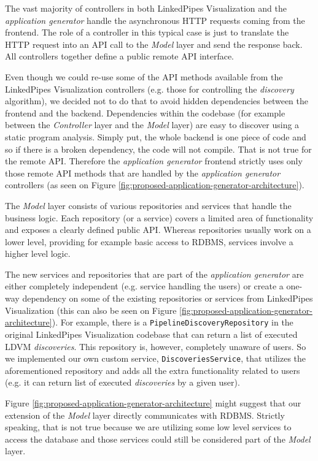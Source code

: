 The vast majority of controllers in both LinkedPipes Visualization and the \emph{application generator} handle the asynchronous HTTP requests coming from the frontend. The role of a controller in this typical case is just to translate the HTTP request into an API call to the \emph{Model} layer and send the response back. All controllers together define a public remote API interface.

Even though we could re-use some of the API methods available from the LinkedPipes Visualization controllers (e.g. those for controlling the \emph{discovery} algorithm), we decided not to do that to avoid hidden dependencies between the frontend and the backend. Dependencies within the  codebase (for example between the \emph{Controller} layer and the \emph{Model} layer) are easy to discover using a static program analysis. Simply put, the whole backend is one piece of code and so if there is a broken dependency, the code will not compile. That is not true for the remote API. Therefore the \emph{application generator} frontend strictly uses only those remote API methods that are handled by the \emph{application generator} controllers (as seen on Figure \ref{fig:proposed-application-generator-architecture}). 

The \emph{Model} layer consists of various repositories and services that handle the business logic. Each repository (or a service) covers a limited area of functionality and exposes a clearly defined public API. Whereas repositories usually work on a lower level, providing for example basic access to RDBMS, services involve a higher level logic.

The new services and repositories that are part of the \emph{application generator} are either completely independent (e.g. service handling the users) or create a one-way dependency on some of the existing repositories or services from LinkedPipes Visualization (this can also be seen on Figure \ref{fig:proposed-application-generator-architecture}). For example, there is a \texttt{PipelineDiscoveryRepository} in the original LinkedPipes Visualization codebase that can return a list of executed LDVM \emph{discoveries}. This repository is, however, completely unaware of users. So we implemented our own custom service, \texttt{DiscoveriesService}, that utilizes the aforementioned repository and adds all the extra functionality related to users (e.g. it can return list of executed \emph{discoveries} by a given user).

Figure \ref{fig:proposed-application-generator-architecture} might suggest that our extension of the \emph{Model} layer directly communicates with RDBMS. Strictly speaking, that is not true because we are utilizing some low level services to access the database and those services could still be considered part of the \emph{Model} layer.

